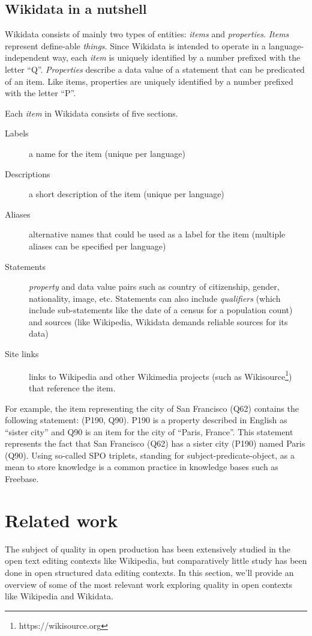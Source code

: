 \documentclass{sig-alternate}
\begin{document}
\subsection{Wikidata in a nutshell}
Wikidata consists of mainly two types of entities: \textit{items} and \textit{properties}. \textit{Items} represent define-able \textit{things}. Since Wikidata is intended to operate in a language-independent way, each \textit{item} is uniquely identified by a number prefixed with the letter ``Q''.  \textit{Properties} describe a data value of a statement that can be predicated of an item.  Like items, properties are uniquely identified by a number prefixed with the letter ``P''.

Each \textit{item} in Wikidata consists of five sections.

\begin{description}
\item[Labels] a name for the item (unique per language)
\item[Descriptions] a short description of the item (unique per language)
\item[Aliases] alternative names that could be used as a label for the item (multiple aliases can be specified per language)
\item[Statements] \textit{property} and data value pairs such as country of citizenship, gender, nationality, image, etc.  Statements can also include \textit{qualifiers} (which include sub-statements like the date of a census for a population count) and sources (like Wikipedia, Wikidata demands reliable sources for its data)
\item[Site links] links to Wikipedia and other Wikimedia projects (such as Wikisource\footnote{https://wikisource.org}) that reference the item.
\end{description}

For example, the item representing the city of San Francisco (Q62) contains the following statement: (P190, Q90).  P190 is a property described in English as ``sister city'' and Q90 is an item for the city of ``Paris, France''.  This statement represents the fact that San Francisco (Q62) has a sister city (P190) named Paris (Q90). Using so-called SPO triplets, standing for subject-predicate-object, as a mean to store knowledge is a common practice in knowledge bases such as Freebase.

\section{Related work}
The subject of quality in open production has been extensively studied in the open text editing contexts like Wikipedia, but comparatively little study has been done in open structured data editing contexts. In this section, we'll provide an overview of some of the most relevant work exploring quality in open contexts like Wikipedia and Wikidata.
\end{document}
